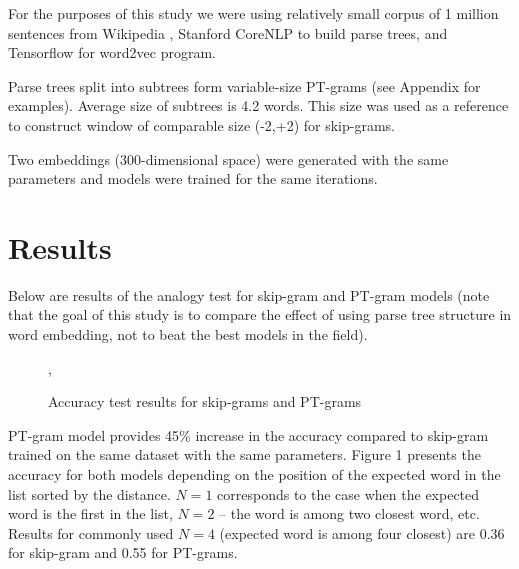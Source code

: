 \documentclass[12pt]{article}
\begin{document}
For the purposes of this study we were using relatively small
corpus of 1 million sentences from Wikipedia \cite{leipzigcorpora},
Stanford CoreNLP \cite{corenlp} to build parse trees, and
Tensorflow \cite{tensorflow} for word2vec program.

Parse trees split into subtrees form variable-size PT-grams
(see Appendix for examples).
Average size of subtrees is 4.2 words.
This size was used as a reference to construct
window of comparable size (-2,+2) for skip-grams.

Two embeddings (300-dimensional space)
were generated with the same parameters and models were trained
for the same iterations.

\section{Results}

Below are results of the analogy test for skip-gram and PT-gram
models (note that the goal of this study is to compare the effect
of using parse tree structure in word embedding, not to beat the
best models in the field).

\begin{center}
\begin{figure}[H]
\caption{Accuracy test results for skip-grams and PT-grams},
\centering
{}
\end{figure}
\end{center}

PT-gram model provides 45\% increase in the accuracy compared
to skip-gram trained on the same dataset with the same parameters.
Figure 1 presents the accuracy for both models depending on the
position of the expected word in the list sorted by the distance.
$N=1$ corresponds to the case when the expected word is the first in the
list, $N=2$ -- the word is among two closest word, etc. Results for
commonly used $N=4$ (expected word is among four closest) are 0.36 for
skip-gram and 0.55 for PT-grams.
\end{document}

